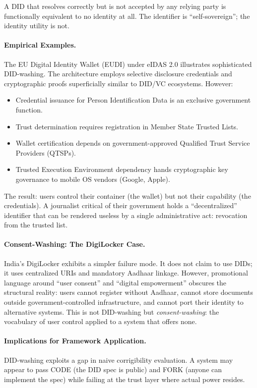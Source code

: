 \documentclass{article}
\begin{document}
A DID that resolves correctly but is not accepted by any relying party is functionally equivalent to no identity at all. The identifier is ``self-sovereign''; the identity utility is not.

\paragraph{Empirical Examples.} The EU Digital Identity Wallet (EUDI) under eIDAS 2.0 \citep{eidas2024} illustrates sophisticated DID-washing. The architecture employs selective disclosure credentials and cryptographic proofs superficially similar to DID/VC ecosystems. However:

\begin{itemize}[noitemsep,topsep=0pt]
    \item Credential issuance for Person Identification Data is an exclusive government function.
    \item Trust determination requires registration in Member State Trusted Lists.
    \item Wallet certification depends on government-approved Qualified Trust Service Providers (QTSPs).
    \item Trusted Execution Environment dependency hands cryptographic key governance to mobile OS vendors (Google, Apple).
\end{itemize}

The result: users control their container (the wallet) but not their capability (the credentials). A journalist critical of their government holds a ``decentralized'' identifier that can be rendered useless by a single administrative act: revocation from the trusted list.

\paragraph{Consent-Washing: The DigiLocker Case.} India's DigiLocker exhibits a simpler failure mode. It does not claim to use DIDs; it uses centralized URIs and mandatory Aadhaar linkage. However, promotional language around ``user consent'' and ``digital empowerment'' obscures the structural reality: users cannot register without Aadhaar, cannot store documents outside government-controlled infrastructure, and cannot port their identity to alternative systems. This is not DID-washing but \textit{consent-washing}: the vocabulary of user control applied to a system that offers none.

\paragraph{Implications for Framework Application.} DID-washing exploits a gap in naive corrigibility evaluation. A system may appear to pass CODE (the DID spec is public) and FORK (anyone can implement the spec) while failing at the trust layer where actual power resides.
\end{document}
